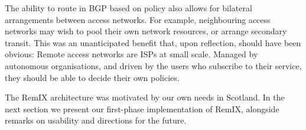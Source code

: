 The ability to route in BGP based on policy also allows for bilateral
arrangements between access networks. For example, neighbouring access networks
may wish to pool their own network resources, or arrange secondary transit. This
was an unanticipated benefit that, upon reflection, should have been obvious:
Remote access networks are ISPs at small scale. Managed by
autonomous organisations, and driven by the users who subscribe to their
service, they should be able to decide their own policies.

The RemIX architecture was motivated by our own needs in Scotland. In the next section we present our first-phase implementation of RemIX, alongside remarks on usability and directions for the future.

